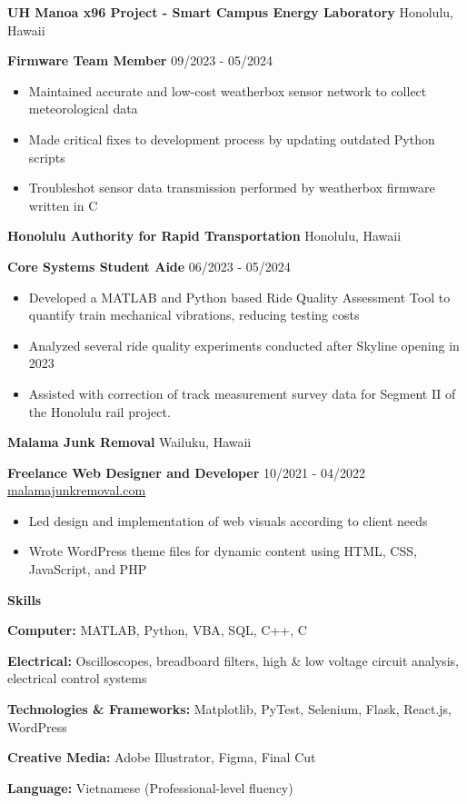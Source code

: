 \documentclass[11pt]{article}
\begin{document}
\vspace{12pt}

\textbf{UH Manoa x96 Project - Smart Campus Energy Laboratory} \hfill Honolulu, Hawaii

\textbf{Firmware Team Member} \hfill 09/2023 - 05/2024
\begin{itemize}[noitemsep, topsep=0pt, partopsep=0pt, parsep=0pt]
    \item Maintained accurate and low-cost weatherbox sensor network to collect meteorological data
    \item Made critical fixes to development process by updating outdated Python scripts
    \item Troubleshot sensor data transmission performed by weatherbox firmware written in C
\end{itemize}

\vspace{12pt}


\textbf{Honolulu Authority for Rapid Transportation} \hfill Honolulu, Hawaii

\textbf{Core Systems Student Aide} \hfill 06/2023 - 05/2024
\begin{itemize}[noitemsep, topsep=0pt, partopsep=0pt, parsep=0pt]
    \item Developed a MATLAB and Python based Ride Quality Assessment Tool to quantify train mechanical vibrations, reducing testing costs
    \item Analyzed several ride quality experiments conducted after Skyline opening in 2023
    \item Assisted with correction of track measurement survey data for Segment II of the Honolulu rail project. 
\end{itemize}

\vspace{12pt}

\textbf{Malama Junk Removal} \hfill Wailuku, Hawaii

\textbf{Freelance Web Designer and Developer} \hfill 10/2021 - 04/2022 \\
\href{https://malamajunkremoval.com}{malamajunkremoval.com}
\begin{itemize}[noitemsep, topsep=0pt, partopsep=0pt, parsep=0pt]
    \item Led design and implementation of web visuals according to client needs
    \item Wrote WordPress theme files for dynamic content using HTML, CSS, JavaScript, and PHP
\end{itemize}


\begin{center}
    \textbf{Skills}
\end{center}

\textbf{Computer:} MATLAB, Python, VBA, SQL, C++, C

\textbf{Electrical:} Oscilloscopes, breadboard filters, high \& low voltage circuit analysis, electrical control systems

\textbf{Technologies \& Frameworks:} Matplotlib, PyTest, Selenium, Flask, React.js,  WordPress

\textbf{Creative Media:} Adobe Illustrator, Figma, Final Cut

\textbf{Language:} Vietnamese (Professional-level fluency)
\end{document}
